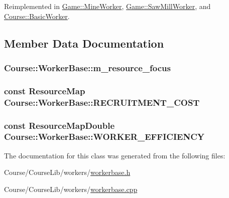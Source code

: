 Reimplemented in \hyperlink{classGame_1_1MineWorker_a515a32b59f08ee1577210887166dacb0}{Game\-::\-Mine\-Worker}, \hyperlink{classGame_1_1SawMillWorker_a51596a8864954a22c6b69303b5e408d8}{Game\-::\-Saw\-Mill\-Worker}, and \hyperlink{classCourse_1_1BasicWorker_a870cf500ea86d30db583ce64299d9df4}{Course\-::\-Basic\-Worker}.



\subsection{Member Data Documentation}
\hypertarget{classCourse_1_1WorkerBase_aeb20af8ac5fede53f8bb68e41b87937c}{
\subsubsection[{m\-\_\-resource\-\_\-focus}]{ Course\-::\-Worker\-Base\-::m\-\_\-resource\-\_\-focus\hspace{0.3cm}{\ttfamily [private]}}}\label{classCourse_1_1WorkerBase_aeb20af8ac5fede53f8bb68e41b87937c}
\hypertarget{classCourse_1_1WorkerBase_a0734e9b62296511492aca7c2ce531197}{
\subsubsection[{R\-E\-C\-R\-U\-I\-T\-M\-E\-N\-T\-\_\-\-C\-O\-S\-T}]{\setlength{\rightskip}{0pt plus 5cm}const {\bf Resource\-Map} Course\-::\-Worker\-Base\-::\-R\-E\-C\-R\-U\-I\-T\-M\-E\-N\-T\-\_\-\-C\-O\-S\-T}}\label{classCourse_1_1WorkerBase_a0734e9b62296511492aca7c2ce531197}
\hypertarget{classCourse_1_1WorkerBase_ad20bcd4fba20ad9d287860cdaeedbcca}{
\subsubsection[{W\-O\-R\-K\-E\-R\-\_\-\-E\-F\-F\-I\-C\-I\-E\-N\-C\-Y}]{\setlength{\rightskip}{0pt plus 5cm}const {\bf Resource\-Map\-Double} Course\-::\-Worker\-Base\-::\-W\-O\-R\-K\-E\-R\-\_\-\-E\-F\-F\-I\-C\-I\-E\-N\-C\-Y}}\label{classCourse_1_1WorkerBase_ad20bcd4fba20ad9d287860cdaeedbcca}


The documentation for this class was generated from the following files\-:\begin{DoxyCompactItemize}
\item 
Course/\-Course\-Lib/workers/\hyperlink{workerbase_8h}{workerbase.\-h}\item 
Course/\-Course\-Lib/workers/\hyperlink{workerbase_8cpp}{workerbase.\-cpp}\end{DoxyCompactItemize}
